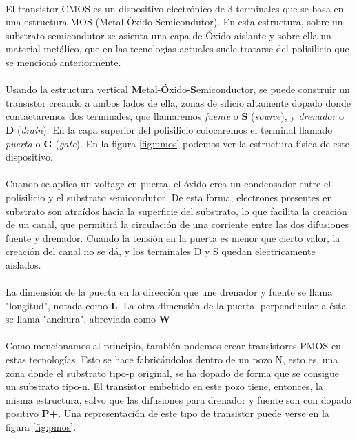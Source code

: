 \paragraph{}
El transistor CMOS es un dispositivo electrónico de 3 terminales que se basa
en una estructura MOS (Metal-Óxido-Semicondutor). En esta estructura, sobre un
substrato semicondutor se asienta una capa de Óxido aislante y sobre ella un
material metálico, que en las tecnologías actuales suele tratarse del polisilicio
que se mencionó anteriormente.

\paragraph{}
Usando la estructura vertical \textbf{M}etal-\textbf{Ó}xido-\textbf{S}emiconductor,
se puede construir un transistor creando a ambos lados de ella, zonas de silicio
altamente dopado donde contactaremos dos terminales, que llamaremos \textit{fuente} o \textbf{S}
(\textit{source}), y \textit{drenador} o \textbf{D} (\textit{drain}). En la capa superior
del polisilicio colocaremos el terminal llamado \textit{puerta} o \textbf{G} (\textit{gate}).
En la figura \ref{fig:nmos} podemos ver la estructura física de este dispositivo.


\paragraph{}
Cuando se aplica un voltage en puerta, el óxido crea un
condensador entre el polisilicio y el substrato semicondutor. De esta forma,
electrones presentes en substrato son atraídos hacia la superficie del substrato,
lo que facilita la creación de un canal, que permitirá la circulación de una
corriente entre las dos difusiones fuente y drenador. Cuando la tensión en la puerta
es menor que cierto valor, la creación del canal no se dá, y los terminales D y S
quedan electricamente aislados.

\paragraph{}
La dimensión de la puerta en la dirección que une drenador y fuente se llama
"longitud", notada como \textbf{L}. La otra dimensión de la puerta, perpendicular a ésta
se llama "anchura", abreviada como \textbf{W}

\paragraph{}
Como mencionamos al principio, también podemos crear transistores PMOS en estas
tecnologías. Esto se hace fabricándolos dentro de un pozo N, esto es, una zona
donde el substrato tipo-p original, se ha dopado de forma que se consigue un substrato
tipo-n. El transistor embebido en este pozo tiene, entonces, la misma estructura,
salvo que las difusiones para drenador y fuente son con dopado positivo \textbf{P+}.
Una representación de este tipo de transistor puede verse en la figura \ref{fig:pmos}.

